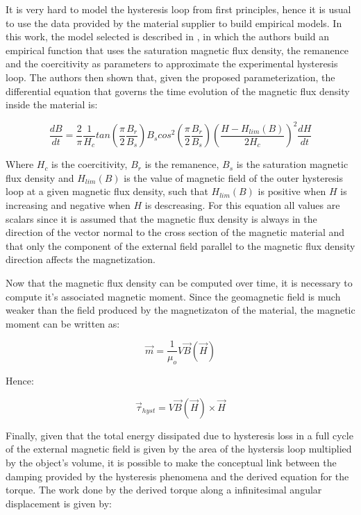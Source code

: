 \indent
	It is very hard to model the hysteresis loop from first principles, hence it is usual to use the data provided by the material supplier to build empirical models. In this work, the model selected is described in \cite{FLATLEY}, in which the authors build an empirical function that uses the saturation magnetic flux density, the remanence and the coercitivity as parameters to approximate the experimental hysteresis loop. The authors then shown that, given  the proposed parameterization, the differential equation that governs the time evolution of the magnetic flux density inside the material is:

\begin{equation}
	\frac{dB}{dt} = \frac{2}{\pi}\frac{1}{H_c} tan\left( \frac{\pi}{2}\frac{B_r}{B_s} \right)B_s cos^2 \left(\frac{\pi}{2}\frac{B_r}{B_s}  \right) \left( \frac{H - H_{lim}(B)}{2H_c} \right)^2\frac{dH}{dt}
\end{equation}

\indent
	Where $H_c$ is the coercitivity, $B_r$ is the remanence, $B_s$ is the saturation magnetic flux density and $H_{lim}(B)$ is the value of magnetic field of the outer hysteresis loop at a given magnetic flux density, such that $H_{lim}(B)$ is positive when $H$ is increasing and negative when $H$ is descreasing. For this equation all values are scalars since it is assumed that the magnetic flux density is always in the direction of the vector normal to the cross section of the magnetic material and that only the component of the external field parallel to the magnetic flux density direction affects the magnetization.

\indent
	Now that the magnetic flux density can be computed over time, it is necessary to compute it's associated magnetic moment. Since the geomagnetic field is much weaker than the field produced by the magnetizaton of the material, the magnetic moment can be written as:

\begin{equation}
	\vec{m} = \frac{1}{\mu_o}V\vec{B}(\vec{H})
\end{equation}

\indent Hence:

\begin{equation}
	\vec{\tau}_{hyst} = V\vec{B}(\vec{H}) \times \vec{H} 
\end{equation}

\indent
	Finally, given that the total energy dissipated due to hysteresis loss in a full cycle of the external magnetic field is given by the area of the hystersis loop multiplied by the object's volume, it is possible to make the conceptual link between the damping provided by the hysteresis phenomena and the derived equation for the torque. The work done by the derived torque along a infinitesimal angular displacement is given by:

